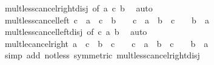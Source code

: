 \begin{isabellebody}
\ mult{\isacharunderscore}{\kern0pt}less{\isacharunderscore}{\kern0pt}cancel{\isacharunderscore}{\kern0pt}right{\isacharunderscore}{\kern0pt}disj\ {\isacharbrackleft}{\kern0pt}of\ a\ c\ b{\isacharbrackright}{\kern0pt}\ \isamarkupfalse%
\ auto%
\endisatagproof
{\isafoldproof}%
%
\isadelimproof
\isanewline
%
\endisadelimproof
\isanewline
{}\isamarkupfalse%
\ mult{\isacharunderscore}{\kern0pt}less{\isacharunderscore}{\kern0pt}cancel{\isacharunderscore}{\kern0pt}left{\isacharcolon}{\kern0pt}\ {\isachardoublequoteopen}c\ {\isacharasterisk}{\kern0pt}\ a\ {\isacharless}{\kern0pt}\ c\ {\isacharasterisk}{\kern0pt}\ b\ {\isasymlongleftrightarrow}\ {\isacharparenleft}{\kern0pt}{}\ {\isasymle}\ c\ {\isasymlongrightarrow}\ a\ {\isacharless}{\kern0pt}\ b{\isacharparenright}{\kern0pt}\ {\isasymand}\ {\isacharparenleft}{\kern0pt}c\ {\isasymle}\ {}\ {\isasymlongrightarrow}\ b\ {\isacharless}{\kern0pt}\ a{\isacharparenright}{\kern0pt}{\isachardoublequoteclose}\isanewline
%
\isadelimproof
\ \ %
\endisadelimproof
%
\isatagproof
{}\isamarkupfalse%
\ mult{\isacharunderscore}{\kern0pt}less{\isacharunderscore}{\kern0pt}cancel{\isacharunderscore}{\kern0pt}left{\isacharunderscore}{\kern0pt}disj\ {\isacharbrackleft}{\kern0pt}of\ c\ a\ b{\isacharbrackright}{\kern0pt}\ \isamarkupfalse%
\ auto%
\endisatagproof
{\isafoldproof}%
%
\isadelimproof
\isanewline
%
\endisadelimproof
\isanewline
{}\isamarkupfalse%
\ mult{\isacharunderscore}{\kern0pt}le{\isacharunderscore}{\kern0pt}cancel{\isacharunderscore}{\kern0pt}right{\isacharcolon}{\kern0pt}\ {\isachardoublequoteopen}a\ {\isacharasterisk}{\kern0pt}\ c\ {\isasymle}\ b\ {\isacharasterisk}{\kern0pt}\ c\ {\isasymlongleftrightarrow}\ {\isacharparenleft}{\kern0pt}{}\ {\isacharless}{\kern0pt}\ c\ {\isasymlongrightarrow}\ a\ {\isasymle}\ b{\isacharparenright}{\kern0pt}\ {\isasymand}\ {\isacharparenleft}{\kern0pt}c\ {\isacharless}{\kern0pt}\ {}\ {\isasymlongrightarrow}\ b\ {\isasymle}\ a{\isacharparenright}{\kern0pt}{\isachardoublequoteclose}\isanewline
%
\isadelimproof
\ \ %
\endisadelimproof
%
\isatagproof
{}\isamarkupfalse%
\ {\isacharparenleft}{\kern0pt}simp\ add{\isacharcolon}{\kern0pt}\ not{\isacharunderscore}{\kern0pt}less\ {\isacharbrackleft}{\kern0pt}symmetric{\isacharbrackright}{\kern0pt}\ mult{\isacharunderscore}{\kern0pt}less{\isacharunderscore}{\kern0pt}cancel{\isacharunderscore}{\kern0pt}right{\isacharunderscore}{\kern0pt}disj{\isacharparenright}{\kern0pt}%
\endisatagproof
{\isafoldproof}%
%
\isadelimproof

\end{isabellebody}
